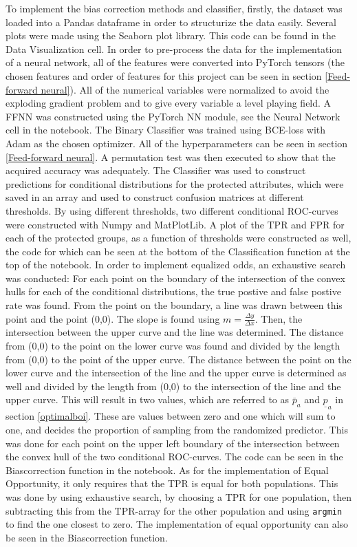 \documentclass[11pt, fleqn, titlepage]{article}
\begin{document}
	\noindent To implement the bias correction methods and classifier, firstly, the dataset was loaded into a Pandas dataframe in order to structurize the data easily. Several plots were made using the Seaborn plot library. This code can be found in the Data Visualization cell. In order to pre-process the data for the implementation of a neural network, all of the features were converted into PyTorch tensors (the chosen features and order of features for this project can be seen in section \ref{Feed-forward neural}). All of the numerical variables were normalized to avoid the exploding gradient problem and to give every variable a level playing field. A FFNN was constructed using the PyTorch NN module, see the Neural Network cell in the notebook. The Binary Classifier was trained using BCE-loss with Adam as the chosen optimizer. All of the hyperparameters can be seen in section \ref{Feed-forward neural}. A permutation test was then executed to show that the acquired accuracy was adequately. The Classifier was used to construct predictions for conditional distributions for the protected attributes, which were saved in an array and used to construct confusion matrices at different thresholds. By using different thresholds, two  different conditional ROC-curves were constructed with Numpy and MatPlotLib. A plot of the TPR and FPR for each of the protected groups, as a function of thresholds were constructed as well, the code for which can be seen at the bottom of the Classification function at the top of the notebook. In order to implement equalized odds, an exhaustive search was conducted: For each point on the boundary of the intersection of the convex hulls for each of the conditional distributions, the true postive and false postive rate was found. From the point on the boundary, a line was drawn between this point and the point (0,0). The slope is found using $ m=\frac{\Delta y}{\Delta x} $. Then, the intersection between the upper curve and the line was determined. The distance from (0,0) to the point on the lower curve was found and divided by the length from (0,0) to the point of the upper curve. The distance between the point on the lower curve and the intersection of the line and the upper curve is determined as well and divided by the length from (0,0) to the intersection of the line and the upper curve. This will result in two values, which are referred to as $ \bar p_a $ and $ \underline p_a $ in section \ref{optimalboi}. These are values between zero and one which will sum to one, and decides the proportion of sampling from the randomized predictor. This was done for each point on the upper left boundary of the intersection between the convex hull of the two conditional ROC-curves. The code can be seen in the Biascorrection function in the notebook. As for the implementation of Equal Opportunity, it only requires that the TPR is equal for both populations. This was done by using exhaustive search, by choosing a TPR for one population, then subtracting this from the TPR-array for the other population and using \texttt{argmin} to find the one closest to zero. The implementation of equal opportunity can also be seen in the Biascorrection function. 
	
\end{document}
